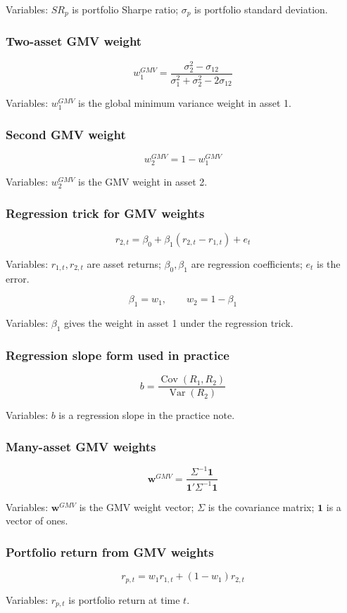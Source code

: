 \documentclass[
  8pt,
  twocolumn]{extarticle}
\begin{document}
Variables: \(SR_p\) is portfolio Sharpe ratio; \(\sigma_p\) is portfolio
standard deviation.

\subsubsection{Two-asset GMV weight}\label{two-asset-gmv-weight}

\[
w_1^{GMV}=\frac{\sigma_2^2-\sigma_{12}}{\sigma_1^2+\sigma_2^2-2\sigma_{12}}
\]

Variables: \(w_1^{GMV}\) is the global minimum variance weight in asset
1.

\subsubsection{Second GMV weight}\label{second-gmv-weight}

\[
w_2^{GMV}=1-w_1^{GMV}
\]

Variables: \(w_2^{GMV}\) is the GMV weight in asset 2.

\subsubsection{Regression trick for GMV
weights}\label{regression-trick-for-gmv-weights}

\[
r_{2,t}=\beta_0+\beta_1(r_{2,t}-r_{1,t})+e_t
\]

Variables: \(r_{1,t},r_{2,t}\) are asset returns; \(\beta_0,\beta_1\)
are regression coefficients; \(e_t\) is the error.

\[
\beta_1=w_1,\qquad w_2=1-\beta_1
\]

Variables: \(\beta_1\) gives the weight in asset 1 under the regression
trick.

\subsubsection{Regression slope form used in
practice}\label{regression-slope-form-used-in-practice}

\[
b=\frac{\operatorname{Cov}(R_1,R_2)}{\operatorname{Var}(R_2)}
\]

Variables: \(b\) is a regression slope in the practice note.

\subsubsection{Many-asset GMV weights}\label{many-asset-gmv-weights}

\[
\mathbf w^{GMV}=\frac{\Sigma^{-1}\mathbf 1}{\mathbf 1'\Sigma^{-1}\mathbf 1}
\]

Variables: \(\mathbf w^{GMV}\) is the GMV weight vector; \(\Sigma\) is
the covariance matrix; \(\mathbf 1\) is a vector of ones.

\subsubsection{Portfolio return from GMV
weights}\label{portfolio-return-from-gmv-weights}

\[
r_{p,t}=w_1r_{1,t}+(1-w_1)r_{2,t}
\]

Variables: \(r_{p,t}\) is portfolio return at time \(t\).
\end{document}
